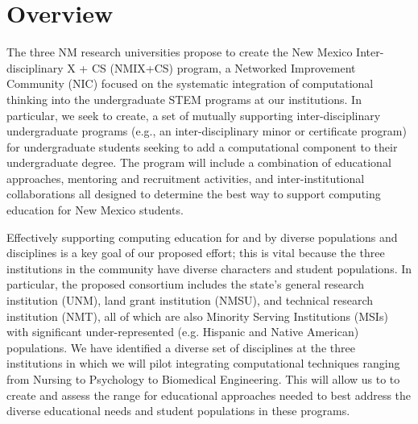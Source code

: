 \section{Overview}
\label{sec:overview}

The three NM research universities propose to create the New Mexico Inter-disciplinary X + CS (NMIX+CS) program, a Networked Improvement Community (NIC) focused on the systematic integration of computational thinking into the undergraduate STEM programs at our institutions. In particular, we seek to create,
a set of mutually supporting inter-disciplinary undergraduate programs (e.g., an inter-disciplinary minor or
certificate program) for undergraduate students seeking to add a computational component to their undergraduate
degree. The program will include a combination of educational approaches, mentoring and recruitment activities, and inter-institutional collaborations all designed to determine the best way to support computing education for New Mexico students.

Effectively supporting computing education for and by diverse populations
and disciplines is a key goal of our proposed effort; this is vital because the three institutions in the community have diverse
characters and student populations. In particular, the proposed consortium includes the state's general research institution (UNM), land grant institution (NMSU), and technical research institution (NMT), all of which
are also Minority Serving Institutions (MSIs) with significant under-represented (e.g. Hispanic
and Native American) populations. We have identified a diverse set of disciplines at the three institutions in which we will pilot integrating computational techniques ranging from Nursing to Psychology to Biomedical Engineering. This will allow us to to create and assess the range for  educational approaches needed to best address the diverse educational needs and student populations in these programs.

